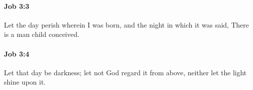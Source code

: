 		\paragraph{Job 3:3} %
			\label{JOB-3-3}

			Let the day perish wherein I was born, and the night in which it was said, There is a man child conceived.


		\paragraph{Job 3:4} %
			\label{JOB-3-4}

			Let that day be darkness; let not God regard it from above, neither let the light shine upon it.


